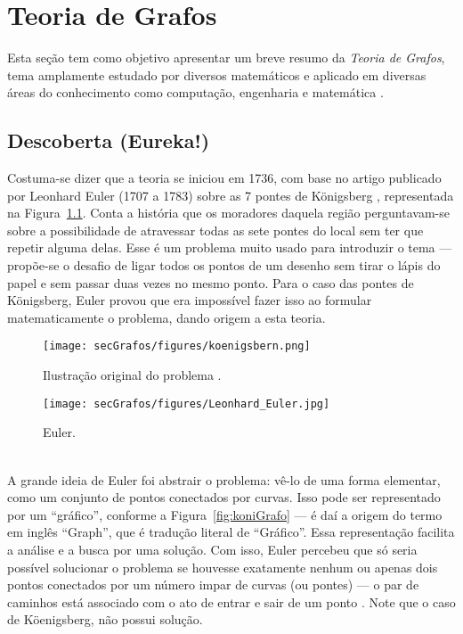 \chapter{Teoria de Grafos\label{ap:grafos}}
Esta seção tem como objetivo apresentar um breve resumo da \textit{Teoria de Grafos}, tema amplamente estudado por diversos matemáticos e aplicado em diversas áreas do conhecimento como computação, engenharia e matemática \cite{graphTheoryApplicationsBondy}.

\section*{Descoberta (Eureka!)}
Costuma-se dizer que a teoria se iniciou em 1736, com base no artigo publicado por Leonhard Euler (1707 a 1783) sobre as 7 pontes de Königsberg \cite{euler:KOENIGSBERG}, representada na Figura~\ref{fig:koni}. Conta a história que os moradores daquela região perguntavam-se sobre a possibilidade de atravessar todas as sete pontes do local sem ter que repetir alguma delas. Esse é um problema muito usado para introduzir o tema \cite{problemsInMath} --- propõe-se o desafio de ligar todos os pontos de um desenho sem tirar o lápis do papel e sem passar duas vezes no mesmo ponto. Para o caso das pontes de Königsberg, Euler provou que era impossível fazer isso ao formular matematicamente o problema, dando origem a esta teoria.

\begin{minipage}{0.60 \linewidth}
	\begin{figure}[H]
		\begin{center}
			\texttt{[image: secGrafos/figures/koenigsbern.png]}
		\end{center}
		\caption{Ilustração original do problema \cite{euler:KOENIGSBERG}.}
		\label{fig:koni}
	\end{figure}
\end{minipage}
\hspace{0.1cm}
\begin{minipage}{0.35 \linewidth}
	\begin{figure}[H]
		\begin{center}
			\texttt{[image: secGrafos/figures/Leonhard\_Euler.jpg]}
		\end{center}
		\caption{Euler.}
		\label{fig:euler}
	\end{figure}
\end{minipage}
\\

A grande ideia de Euler foi abstrair o problema: vê-lo de uma forma elementar, como um conjunto de pontos conectados por curvas. Isso pode ser representado por um ``gráfico'', conforme a Figura~\ref{fig:koniGrafo} --- é daí a origem do termo em inglês ``Graph'', que é tradução literal de ``Gráfico''. Essa representação facilita a análise e a busca por uma solução. Com isso, Euler percebeu que só seria possível solucionar o problema se houvesse exatamente nenhum ou apenas dois pontos conectados por um número impar de curvas (ou pontes) --- o par de caminhos está associado com o ato de entrar e sair de um ponto \cite{euler:KOENIGSBERG}. Note que o caso de Köenigsberg, não possui solução.

